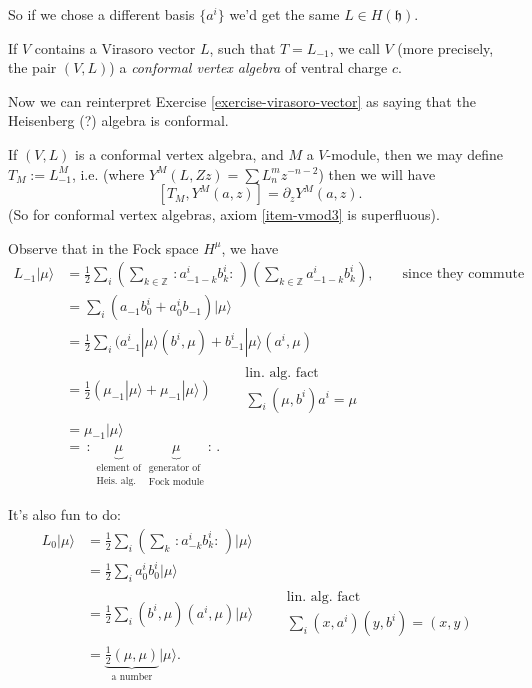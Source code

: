 So if we chose a different basis $\{a^i\}$
we'd get the same
$L \in H(\mathfrak{h})$.

\begin{definition}
\label{definition-conformal-vertex-algebra}
If $V$ contains a Virasoro vector $L$,
such that $T=L_{-1}$,
we call $V$ (more precisely, the pair
$(V,L)$)
a {\it conformal vertex algebra} of ventral
charge $c$.
\end{definition}

\noindent
Now we can reinterpret Exercise
\ref{exercise-virasoro-vector}
as saying that the Heisenberg (?) algebra is
conformal.

\begin{remark}
\label{remark-third-axiom-vmod}
If $(V,L)$ is a conformal vertex algebra,
and $M$ a $V$-module, then we may define
$T_M:=L_{-1}^M$, i.e.
(where $Y^M(L,Zz)=\sum L^m_n z^{-n-2}$)
then we will have
$$
[T_M,Y^M(a,z)]=\partial_zY^M(a,z).
$$
(So for conformal vertex algebras, axiom
\ref{item-vmod3} is superfluous).
\end{remark}

\noindent
Observe that in the Fock space $H^\mu$, we
have
$$
\begin{aligned}
L_{-1}|\mu\rangle&=\frac{1}{2}\sum_i
\left(\sum_{k \in
\mathbb{Z}}\,:\!a^i_{-1-k}b^i_k\!:\,\right)
\left(\sum_{k \in
\mathbb{Z}}a^i_{-1-k}b^i_k\right),
\qquad \text{since they commute}\\
&=\sum_i(a_{-1}b_0^i+a_0^ib_{-1})
|\mu\rangle\\
&=\frac{1}{2}\sum_i(a^i_{-1}|\mu\rangle(b^i,
\mu)
+b^i_{-1}|\mu\rangle (a^i,\mu)\\
&=
\frac{1}{2}(\mu_{-1}|\mu\rangle+\mu_{-1}
|\mu\rangle)
\qquad \substack{\text{lin. alg. fact} \\
\sum_i(\mu,b^i)a^i=\mu}\\
&=\mu_{-1}|\mu\rangle\\
&=\,:\!\underbrace{\mu}
_{\substack{\text{element
of} \\ \text{Heis. alg.}}}
\underbrace{\mu}_{\substack{\text{generator
of} \\ \text{Fock module}}}\!:\,.
\end{aligned}
$$

\noindent
It's also fun to do:
$$
\begin{aligned}
L_0|\mu\rangle&=\frac{1}{2}
\sum_i\left(\sum_k\,:\!a^i_{-k}
b^i_k\!:\,\right)|\mu\rangle\\
&=\frac{1}{2}\sum_i a_0^ib_0^i |\mu\rangle\\
&=\frac{1}{2}\sum_i(b^i,\mu)(a^i,\mu)
|\mu\rangle
\qquad \substack{\text{lin. alg. fact} \\
\sum_i(x,a^i)(y,b^i)=(x,y)}\\
&=\underbrace{\frac{1}{2}(\mu,\mu)}_{\text{a
number}}|\mu\rangle.
\end{aligned}
$$

